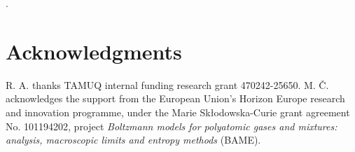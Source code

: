 \documentclass[11pt,a4paper]{amsart}
\begin{document}
 
 

.



\section*{Acknowledgments}
R. A. thanks TAMUQ internal funding research grant 470242-25650.  M. \v{C}. acknowledges
the support from the European Union’s Horizon Europe research and innovation programme, under
the Marie Sk{\l}odowska-Curie grant agreement No. 101194202, project  \emph{Boltzmann models for polyatomic gases and mixtures: analysis, macroscopic limits and entropy methods} (BAME).
	

	
\end{document}
